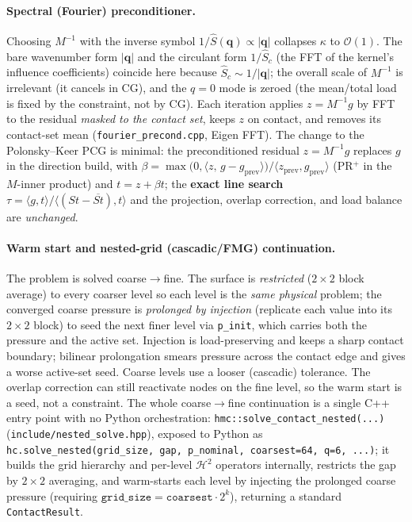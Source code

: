 \documentclass[11pt,a4paper]{article}
\newcommand{\Order}{\mathcal{O}}
\newcommand{\abs}[1]{\left\lvert #1 \right\rvert}
\begin{document}
\paragraph{Spectral (Fourier) preconditioner.}
Choosing $M^{-1}$ with the inverse symbol $1/\widehat S(\mathbf q)\propto
\abs{\mathbf q}$ collapses $\kappa$ to $\Order(1)$. The bare wavenumber form
$\abs{\mathbf q}$ and the circulant form $1/\widehat S_c$ (the FFT of the kernel's
influence coefficients) coincide here because $\widehat S_c\sim 1/\abs{\mathbf q}$;
the overall scale of $M^{-1}$ is irrelevant (it cancels in CG), and the $q{=}0$
mode is zeroed (the mean/total load is fixed by the constraint, not by CG). Each
iteration applies $z=M^{-1}g$ by FFT to the residual \emph{masked to the contact
set}, keeps $z$ on contact, and removes its contact-set mean
(\texttt{fourier\_precond.cpp}, Eigen FFT). The change to the Polonsky--Keer PCG
is minimal: the preconditioned residual $z=M^{-1}g$ replaces $g$ in the direction
build, with $\beta=\max\!\big(0,\langle z,\,g-g_{\text{prev}}\rangle\big)/
\langle z_{\text{prev}},g_{\text{prev}}\rangle$ (PR$^+$ in the $M$-inner product)
and $t=z+\beta t$; the \textbf{exact line search}
$\tau=\langle g,t\rangle/\langle (St-\overline{St}),t\rangle$ and the projection,
overlap correction, and load balance are \emph{unchanged}.

\paragraph{Warm start and nested-grid (cascadic/FMG) continuation.}
The problem is solved coarse$\to$fine. The surface is \emph{restricted}
($2\times2$ block average) to every coarser level so each level is the
\emph{same physical} problem; the converged coarse pressure is \emph{prolonged by
injection} (replicate each value into its $2\times2$ block) to seed the next
finer level via \texttt{p\_init}, which carries both the pressure and the active
set. Injection is load-preserving and keeps a sharp contact boundary; bilinear
prolongation smears pressure across the contact edge and gives a worse active-set
seed. Coarse levels use a looser (cascadic) tolerance. The overlap correction can
still reactivate nodes on the fine level, so the warm start is a seed, not a
constraint. The whole coarse$\to$fine continuation is a single C++ entry point
with no Python orchestration: \texttt{hmc::solve\_contact\_nested(...)}
(\texttt{include/nested\_solve.hpp}), exposed to Python as
\texttt{hc.solve\_nested(grid\_size, gap, p\_nominal, coarsest=64, q=6, ...)};
it builds the grid hierarchy and per-level $\mathcal{H}^2$ operators internally,
restricts the gap by $2\times2$ averaging, and warm-starts each level by
injecting the prolonged coarse pressure (requiring
$\texttt{grid\_size}=\texttt{coarsest}\cdot2^k$), returning a standard
\texttt{ContactResult}.
\end{document}
